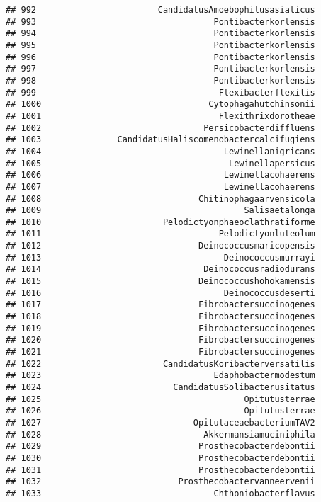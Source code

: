 \documentclass[
]{article}
\begin{document}
\begin{verbatim}
## 992                        CandidatusAmoebophilusasiaticus
## 993                                   Pontibacterkorlensis
## 994                                   Pontibacterkorlensis
## 995                                   Pontibacterkorlensis
## 996                                   Pontibacterkorlensis
## 997                                   Pontibacterkorlensis
## 998                                   Pontibacterkorlensis
## 999                                    Flexibacterflexilis
## 1000                                 Cytophagahutchinsonii
## 1001                                   Flexithrixdorotheae
## 1002                                Persicobacterdiffluens
## 1003               CandidatusHaliscomenobactercalcifugiens
## 1004                                    Lewinellanigricans
## 1005                                     Lewinellapersicus
## 1006                                    Lewinellacohaerens
## 1007                                    Lewinellacohaerens
## 1008                               Chitinophagaarvensicola
## 1009                                        Salisaetalonga
## 1010                        Pelodictyonphaeoclathratiforme
## 1011                                   Pelodictyonluteolum
## 1012                               Deinococcusmaricopensis
## 1013                                    Deinococcusmurrayi
## 1014                                Deinococcusradiodurans
## 1015                               Deinococcushohokamensis
## 1016                                    Deinococcusdeserti
## 1017                               Fibrobactersuccinogenes
## 1018                               Fibrobactersuccinogenes
## 1019                               Fibrobactersuccinogenes
## 1020                               Fibrobactersuccinogenes
## 1021                               Fibrobactersuccinogenes
## 1022                        CandidatusKoribacterversatilis
## 1023                                  Edaphobactermodestum
## 1024                          CandidatusSolibacterusitatus
## 1025                                        Opitutusterrae
## 1026                                        Opitutusterrae
## 1027                              OpitutaceaebacteriumTAV2
## 1028                                Akkermansiamuciniphila
## 1029                               Prosthecobacterdebontii
## 1030                               Prosthecobacterdebontii
## 1031                               Prosthecobacterdebontii
## 1032                           Prosthecobactervanneervenii
## 1033                                  Chthoniobacterflavus

\end{verbatim}
\end{document}
